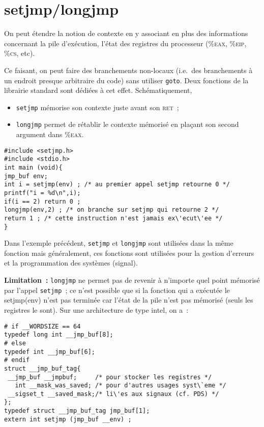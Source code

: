 \section{setjmp/longjmp}
\begin{frame}[fragile]
  On peut \'etendre la notion de contexte en y associant en plus des informations concernant 
  la pile d'ex\'ecution, l'\'etat des registres du  processeur (\%\textsc{eax}, \%\textsc{eip}, \%\textsc{cs}, etc).
  \par\medskip
  Ce faisant, on peut faire des branchements non-locaux (i.e.\ des branchements \`a un endroit
  presque arbitraire du code) sans utiliser \verb+goto+. Deux fonctions de la librairie standard sont d\'edi\'ees
  \`a cet effet. Sch\'ematiquement,
  \begin{itemize}
  \item \texttt{setjmp} m\'emorise son contexte juste avant son \textsc{ret}~;
  \item \texttt{longjmp} permet de r\'etablir le contexte m\'emoris\'e en pla\c{c}ant
	son second argument dans \%\textsc{eax}.
  \end{itemize}
\begin{verbatim}
#include <setjmp.h>
#include <stdio.h>
int main (void){
jmp_buf env;
int i = setjmp(env) ; /* au premier appel setjmp retourne 0 */
printf("i = %d\n",i);
if(i == 2) return 0 ;
longjmp(env,2) ; /* on branche sur setjmp qui retourne 2 */
return 1 ; /* cette instruction n'est jamais ex\'ecut\'ee */
}
\end{verbatim}
\end{frame}
\begin{frame}[fragile]
  Dans l'exemple pr\'ec\'edent, \texttt{setjmp} et  \texttt{longjmp} sont utilis\'ees dans la
  m\^eme fonction mais g\'en\'eralement, ces fonctions sont utilis\'ees pour la gestion 
  d'erreurs et la programmation des syst\`emes (signal).
  \par\smallskip\textbf{Limitation~:} 
  \texttt{longjmp} ne permet pas de revenir \`a n'importe quel point m\'emoris\'e par l'appel \texttt{setjmp}~; ce n'est possible que si la fonction qui a ex\'ecut\'ee le setjmp(env) n'est pas termin\'ee car l'\'etat de la pile n'est pas m\'emoris\'e (seuls les registres le sont).
 Sur une architecture de type intel, on a~:
\begin{verbatim}
# if __WORDSIZE == 64
typedef long int __jmp_buf[8];
# else
typedef int __jmp_buf[6];
# endif
struct __jmp_buf_tag{
 __jmp_buf __jmpbuf;     /* pour stocker les registres */
   int __mask_was_saved; /* pour d'autres usages syst\`eme */
 __sigset_t __saved_mask;/* li\'es aux signaux (cf. PDS) */
};
typedef struct __jmp_buf_tag jmp_buf[1];
extern int setjmp (jmp_buf __env) ;
\end{verbatim}
\end{frame}
